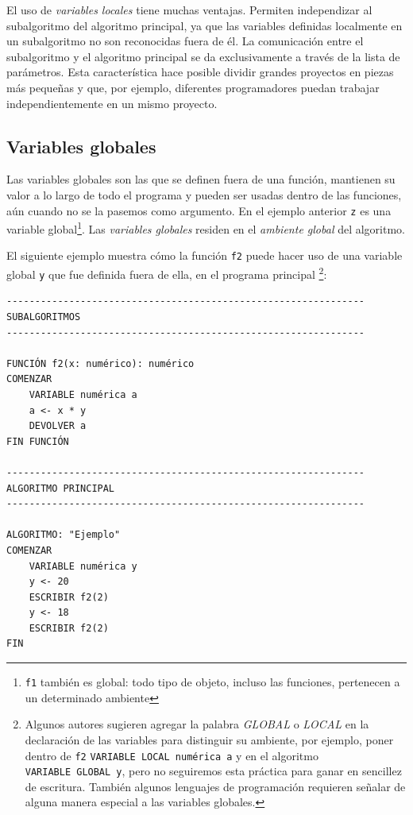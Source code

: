 \documentclass[
]{book}
\begin{document}
El uso de \emph{variables locales} tiene muchas ventajas. Permiten independizar al subalgoritmo del algoritmo principal, ya que las variables definidas localmente en un subalgoritmo no son reconocidas fuera de él. La comunicación entre el subalgoritmo y el algoritmo principal se da exclusivamente a través de la lista de parámetros. Esta característica hace posible dividir grandes proyectos en piezas más pequeñas y que, por ejemplo, diferentes programadores puedan trabajar independientemente en un mismo proyecto.

\hypertarget{variables-globales}{%
\subsection{Variables globales}\label{variables-globales}}

Las variables globales son las que se definen fuera de una función, mantienen su valor a lo largo de todo el programa y pueden ser usadas dentro de las funciones, aún cuando no se la pasemos como argumento. En el ejemplo anterior \texttt{z} es una variable global\footnote{\texttt{f1} también es global: todo tipo de objeto, incluso las funciones, pertenecen a un determinado ambiente}. Las \emph{variables globales} residen en el \emph{ambiente global} del algoritmo.

El siguiente ejemplo muestra cómo la función \texttt{f2} puede hacer uso de una variable global \texttt{y} que fue definida fuera de ella, en el programa principal
\footnote{Algunos autores sugieren agregar la palabra \emph{GLOBAL} o \emph{LOCAL} en la declaración de las variables para distinguir su ambiente, por ejemplo, poner dentro de \texttt{f2} \texttt{VARIABLE\ LOCAL\ numérica\ a} y en el algoritmo \texttt{VARIABLE\ GLOBAL\ y}, pero no seguiremos esta práctica para ganar en sencillez de escritura. También algunos lenguajes de programación requieren señalar de alguna manera especial a las variables globales.}:

\begin{verbatim}
---------------------------------------------------------------
SUBALGORITMOS
---------------------------------------------------------------

FUNCIÓN f2(x: numérico): numérico
COMENZAR
    VARIABLE numérica a
    a <- x * y
    DEVOLVER a
FIN FUNCIÓN

---------------------------------------------------------------
ALGORITMO PRINCIPAL
---------------------------------------------------------------

ALGORITMO: "Ejemplo"
COMENZAR
    VARIABLE numérica y
    y <- 20
    ESCRIBIR f2(2)
    y <- 18
    ESCRIBIR f2(2)
FIN
\end{verbatim}
\end{document}
